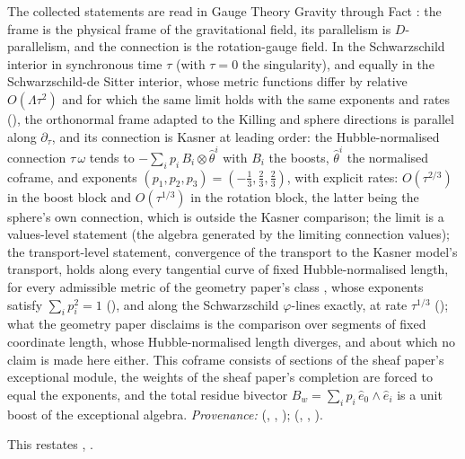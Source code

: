 The collected statements are read in Gauge Theory Gravity through Fact : the frame is the physical frame of the gravitational field, its parallelism is $D$-parallelism, and the connection is the rotation-gauge field. In the Schwarzschild interior in synchronous time $\tau$ (with $\tau = 0$ the singularity), and equally in the Schwarzschild-de Sitter interior, whose metric functions differ by relative $O(\Lambda\tau^2)$ and for which the same limit holds with the same exponents and rates \cite[Thm.~5.9]{ButlerT6} (), the orthonormal frame adapted to the Killing and sphere directions is parallel along $\partial_\tau$, and its connection is Kasner at leading order: the Hubble-normalised connection $\tau\,\omega$ tends to $-\sum_i p_i\, B_i \otimes \hat\theta^i$ with $B_i$ the boosts, $\hat\theta^i$ the normalised coframe, and exponents $(p_1, p_2, p_3) = (-\tfrac13, \tfrac23, \tfrac23)$, with explicit rates: $O(\tau^{2/3})$ in the boost block and $O(\tau^{1/3})$ in the rotation block, the latter being the sphere's own connection, which is outside the Kasner comparison; the limit is a values-level statement (the algebra generated by the limiting connection values); the transport-level statement, convergence of the transport to the Kasner model's transport, holds along every tangential curve of fixed Hubble-normalised length, for every admissible metric of the geometry paper's class \cite[Def.~5.5]{ButlerT6}, whose exponents satisfy $\sum_i p_i^2 = 1$ \cite[Thm.~5.11]{ButlerT6} (), and along the Schwarzschild $\varphi$-lines exactly, at rate $\tau^{1/3}$ \cite[Cor.~5.12]{ButlerT6} (); what the geometry paper disclaims is the comparison over segments of fixed coordinate length, whose Hubble-normalised length diverges, and about which no claim is made here either. This coframe consists of sections of the sheaf paper's exceptional module, the weights of the sheaf paper's completion are forced to equal the exponents, and the total residue bivector $B_w = \sum_i p_i\, \hat e_0\wedge\hat e_i$ is a unit boost of the exceptional algebra. \emph{Provenance:} \cite[Lems.~5.1-5.4, Def.~5.5, Thm.~5.6, Thm.~5.9, Thm.~5.11, Cor.~5.12]{ButlerT6} (, , ); \cite[Thm.~8.16, Prop.~8.26, Thm.~8.27]{ButlerT4} (, , ).

This restates , .
